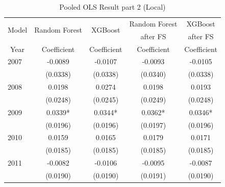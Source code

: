 \documentclass[11pt,a4paper,oneside]{article}
\begin{document}
\begin{table}[!t]
	\centering
	\caption{Pooled OLS Result part 2 (Local)}
	\begin{threeparttable}
	\def\arraystretch{0.7}
	\begin{tabular}{*9c}
		\toprule 
		\multirow{2}{*}{Model}  & \multicolumn{2}{c}{\multirow{2}{*}{Random Forest}} & \multicolumn{2}{c}{\multirow{2}{*}{XGBoost}} & \multicolumn{2}{c}{Random Forest} & \multicolumn{2}{c}{XGBoost}\\
		{} & \multicolumn{2}{c}{} & \multicolumn{2}{c}{} & \multicolumn{2}{c}{after FS} & \multicolumn{2}{c}{after FS}\\
		{Year} & \multicolumn{2}{c}{Coefficient} & \multicolumn{2}{c}{Coefficient} & \multicolumn{2}{c}{Coefficient} & \multicolumn{2}{c}{Coefficient}\\
		\midrule
		\multicolumn{1}{l}{2007} & \multicolumn{2}{c}{-0.0089} & \multicolumn{2}{c}{-0.0107} & \multicolumn{2}{c}{-0.0093}& \multicolumn{2}{c}{-0.0105}\\
		\multicolumn{1}{l}{} & \multicolumn{2}{c}{(0.0338)} & \multicolumn{2}{c}{(0.0338)} & \multicolumn{2}{c}{(0.0340)}& \multicolumn{2}{c}{(0.0338)}\\
		
		\multicolumn{1}{l}{2008} & \multicolumn{2}{c}{0.0198} & \multicolumn{2}{c}{0.0274} & \multicolumn{2}{c}{0.0198}& \multicolumn{2}{c}{0.0193}\\
		\multicolumn{1}{l}{} & \multicolumn{2}{c}{(0.0248)} & \multicolumn{2}{c}{(0.0245)} & \multicolumn{2}{c}{(0.0249)}& \multicolumn{2}{c}{(0.0248)}\\
		
		\multicolumn{1}{l}{2009} & \multicolumn{2}{c}{0.0339*} & \multicolumn{2}{c}{0.0344*} & \multicolumn{2}{c}{0.0362*}& \multicolumn{2}{c}{0.0346*}\\
		\multicolumn{1}{l}{} & \multicolumn{2}{c}{(0.0196)} & \multicolumn{2}{c}{(0.0196)} & \multicolumn{2}{c}{(0.0197)}& \multicolumn{2}{c}{(0.0196)}\\
		
		\multicolumn{1}{l}{2010} & \multicolumn{2}{c}{0.0159} & \multicolumn{2}{c}{0.0165} & \multicolumn{2}{c}{0.0179} & \multicolumn{2}{c}{0.0171}\\
		\multicolumn{1}{l}{} & \multicolumn{2}{c}{(0.0185)} & \multicolumn{2}{c}{(0.0185)} & \multicolumn{2}{c}{(0.0185)}& \multicolumn{2}{c}{(0.0185)}\\
		
		\multicolumn{1}{l}{2011} & \multicolumn{2}{c}{-0.0082} & \multicolumn{2}{c}{-0.0106} & \multicolumn{2}{c}{-0.0095} & \multicolumn{2}{c}{-0.0087}\\
		\multicolumn{1}{l}{} & \multicolumn{2}{c}{(0.0190)} & \multicolumn{2}{c}{(0.0190)} & \multicolumn{2}{c}{(0.0191)} & \multicolumn{2}{c}{(0.0190)}\\
		

\end{tabular}
\end{threeparttable}
\end{table}
\end{document}
